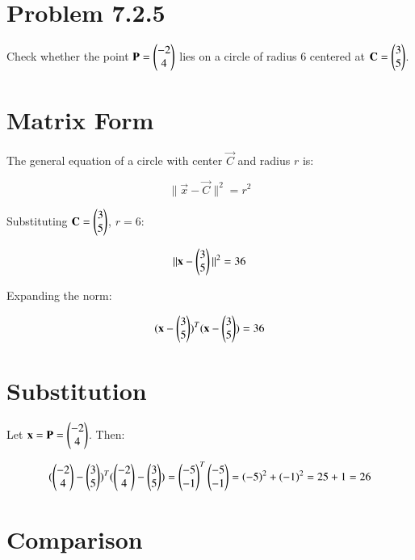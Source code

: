 \documentclass[journal]{IEEEtran}
\begin{document}

\vspace{3cm}

\section*{\large\textbf{Problem 7.2.5}}
\vspace{0.5cm}

Check whether the point \( \mathbf{P} = \begin{pmatrix}-2 \\ 4\end{pmatrix} \) lies on a circle of radius 6 centered at  
\( \mathbf{C} = \begin{pmatrix}3 \\ 5\end{pmatrix} \).

\section*{\large\textbf{Matrix Form}}
\vspace{0.5cm}

The general equation of a circle with center \( \vec{C} \) and radius \( r \) is:

\[
\|\vec{x} - \vec{C}\|^2 = r^2
\]

Substituting \( \mathbf{C} = \begin{pmatrix}3 \\ 5\end{pmatrix} \), \( r = 6 \):

\[
\|\mathbf{x} - \begin{pmatrix}3 \\ 5\end{pmatrix}\|^2 = 36
\]

Expanding the norm:

\[
(\mathbf{x} - \begin{pmatrix}3 \\ 5\end{pmatrix})^T (\mathbf{x} - \begin{pmatrix}3 \\ 5\end{pmatrix}) = 36
\]

\section*{\large\textbf{Substitution}}
\vspace{0.5cm}

Let \( \mathbf{x} = \mathbf{P} = \begin{pmatrix}-2 \\ 4\end{pmatrix} \). Then:

\[
(\begin{pmatrix}-2 \\ 4\end{pmatrix} - \begin{pmatrix}3 \\ 5\end{pmatrix})^T (\begin{pmatrix}-2 \\ 4\end{pmatrix} - \begin{pmatrix}3 \\ 5\end{pmatrix})
= \begin{pmatrix}-5 \\ -1\end{pmatrix}^T \begin{pmatrix}-5 \\ -1\end{pmatrix}
= (-5)^2 + (-1)^2 = 25 + 1 = 26
\]

\section*{\large\textbf{Comparison}}
\vspace{0.5cm}
\end{document}
